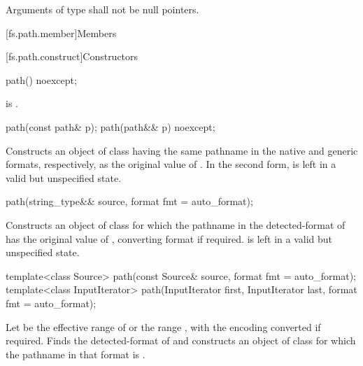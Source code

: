 \pnum
Arguments of type 
shall not be null pointers.

[fs.path.member]{Members}

[fs.path.construct]{Constructors}

%
\begin{itemdecl}
path() noexcept;
\end{itemdecl}

\begin{itemdescr}
\pnum
\ensures
{} is .
\end{itemdescr}

%
\begin{itemdecl}
path(const path& p);
path(path&& p) noexcept;
\end{itemdecl}

\begin{itemdescr}
\pnum
\effects
Constructs an object of class 
having the same pathname in the native and generic formats, respectively,
as the original value of .
In the second form,  is left in a valid but unspecified state.
\end{itemdescr}

%
\begin{itemdecl}
path(string_type&& source, format fmt = auto_format);
\end{itemdecl}

\begin{itemdescr}
\pnum
\effects
Constructs an object of class 
for which the pathname in the detected-format of 
has the original value of ,
converting format if required.
 is left in a valid but unspecified state.
\end{itemdescr}

%
\begin{itemdecl}
template<class Source>
  path(const Source& source, format fmt = auto_format);
template<class InputIterator>
  path(InputIterator first, InputIterator last, format fmt = auto_format);
\end{itemdecl}

\begin{itemdescr}
\pnum
\effects
Let  be the effective range of 
or the range , with the encoding converted if required.
Finds the detected-format of 
and constructs an object of class 
for which the pathname in that format is .
\end{itemdescr}

